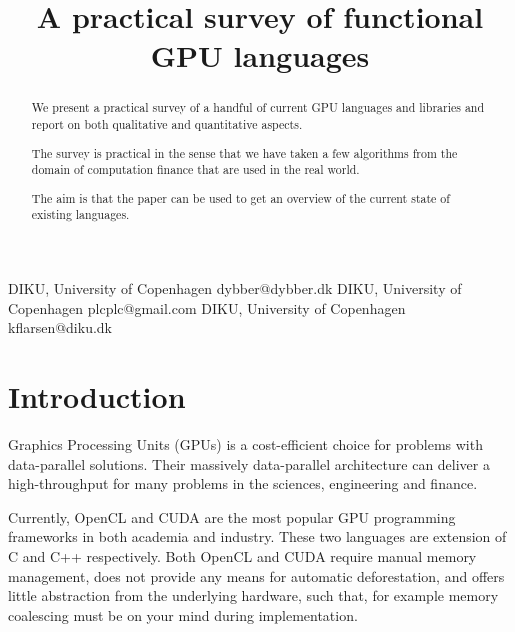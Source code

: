 \documentclass[preprint]{sigplanconf}
\begin{document}
\copyrightdata{[to be supplied]} 


\title{A practical survey of functional GPU languages}

           {DIKU, University of Copenhagen}
           {dybber@dybber.dk}
           {DIKU, University of Copenhagen}
           {plcplc@gmail.com}
           {DIKU, University of Copenhagen}
           {kflarsen@diku.dk}

\maketitle

\begin{abstract}
  We present a practical survey of a handful of current GPU languages and
  libraries and report on both qualitative and quantitative aspects.

  The survey is practical in the sense that we have taken a few
  algorithms from the domain of computation finance that are used in
  the real world.

  The aim is that the paper can be used to get an overview of the
  current state of existing languages.
\end{abstract}




\section{Introduction}
Graphics Processing Units (GPUs) is a cost-efficient choice for
problems with data-parallel solutions. Their massively data-parallel
architecture can deliver a high-throughput for many problems in the
sciences, engineering and finance.

Currently, OpenCL and CUDA are the most popular GPU programming
frameworks in both academia and industry. These two languages are
extension of C and C++ respectively. Both OpenCL and CUDA require
manual memory management, does not provide any means for automatic
deforestation, and offers little abstraction from the underlying
hardware, such that, for example memory coalescing must be on your
mind during implementation.
\end{document}

